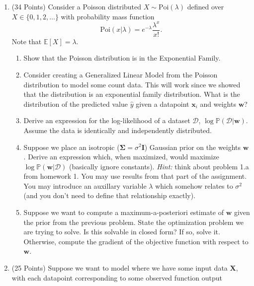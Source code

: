 \documentclass[letter, 12pt]{article}
\begin{document}
\begin{enumerate}
\begin{enumerate}
    \end{enumerate}
    \clearpage
\item (34 Points) Consider a Poisson distributed $X\sim \mathrm{Poi}(\lambda)$ defined
    over $X\in\{0,1,2,\dots\}$ with probability mass function
    \[
        \mathrm{Poi}(x|\lambda) = e^{-\lambda}\frac{\lambda^x}{x!}.
    \]
    Note that $\mathbb{E}[X] = \lambda$.
    \begin{enumerate}
        \item Show that the Poisson distribution is in the Exponential Family.\vfill\vfill
        \item Consider creating a Generalized Linear Model from the Poisson distribution
            to model some count data. This will work since we showed that the distribution
            is an exponential family distribution. What is the distribution of the
            predicted value $\hat y$ given a datapoint $\mathbf{x}_i$ and weights
            $\mathbf{w}$?\vfill\clearpage
        \item Derive an expression for the log-likelihood of a dataset $\mathcal{D}$,
            $\log\mathbb{P}(\mathcal{D}|\mathbf{w})$. Assume the data is identically and
            independently distributed.\vfill
        \item Suppose we place an isotropic ($\mathbf\Sigma = \sigma^2\mathbf{I}$)
            Gaussian prior on the weights $\mathbf{w}$. Derive an expression which, when
            maximized, would maximize
            $\log\mathbb{P}(\mathbf{w}|\mathcal{D})$ (basically ignore constants).
            \textit{Hint:} think about problem
            1.a from homework 1. You may use results from that part of the assignment.
            You may introduce an auxillary variable $\lambda$ which somehow relates
            to $\sigma^2$ (and you don't need to define that relationship exactly).
            \vfill
        \item Suppose we want to compute a maximum-a-posteriori estimate of $\mathbf{w}$
            given the prior from the previous problem. State the optimization problem
            we are trying to solve. Is this solvable in closed form? If so, solve it.
            Otherwise, compute the gradient of the objective function with respect
            to $\mathbf{w}$.\vfill
    \end{enumerate}
    \clearpage
\item (25 Points) Suppose we want to model where we have some input
    data $\mathbf{X}$, with each datapoint corresponding to some observed function output

\end{enumerate}
\end{document}
